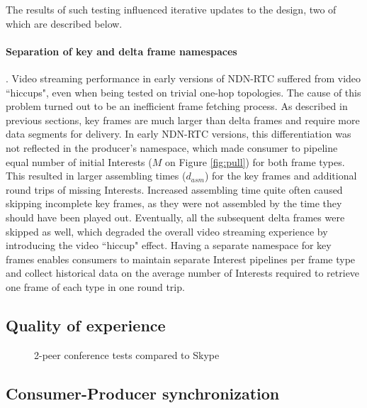 \documentclass{icn/sig-alternate-2012} %
\newcommand{\ndnrtcName}{NDN-RTC} %
\begin{document}
The results of such testing influenced iterative updates to the design, two of which are described below. 

\paragraph{Separation of key and delta frame namespaces}. Video streaming performance in early versions of \ndnrtcName{} suffered from video ``hiccups", even when being tested on trivial one-hop topologies. The cause of this problem turned out to be an inefficient frame fetching process.
As described in previous sections, key frames are much larger than delta frames and require more data segments for delivery. In early \ndnrtcName{} versions, this differentiation was not reflected in the producer's namespace, which made consumer to pipeline equal number of initial Interests ($M$ on Figure \ref{fig:pull}) for both frame types. This resulted in larger assembling times ($d_{asm}$) for the key frames and additional round trips of missing Interests. Increased assembling time quite often caused skipping incomplete key frames, as they were not assembled by the time they should have been played out. Eventually, all the subsequent delta frames were skipped as well, which degraded the overall video streaming experience by introducing the video ``hiccup" effect. Having a separate namespace for key frames enables consumers to maintain separate Interest pipelines per frame type and collect historical data on the average number of Interests required to retrieve one frame of each type in one round trip.
\subsection{Quality of experience}
\begin{figure}[t!]
\centering
\begin{tiny}
\def\svgwidth{0.5\textwidth}
\end{tiny}
\vspace{-18pt}
\caption{2-peer conference tests compared to Skype}
\label{fig:tests-skype}
\end{figure}


\subsection{Consumer-Producer synchronization}
\end{document}
